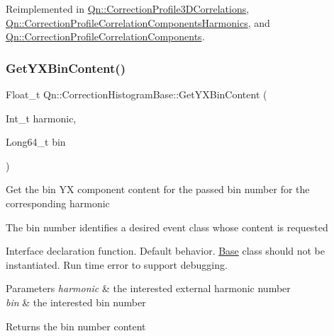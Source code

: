 Reimplemented in \mbox{\hyperlink{classQn_1_1CorrectionProfile3DCorrelations_a779657f7aabd240f26fae0690a5b24a7}{Qn\+::\+Correction\+Profile3\+D\+Correlations}}, \mbox{\hyperlink{classQn_1_1CorrectionProfileCorrelationComponentsHarmonics_a5cad74c0b9396b104ab630c246bf19df}{Qn\+::\+Correction\+Profile\+Correlation\+Components\+Harmonics}}, and \mbox{\hyperlink{classQn_1_1CorrectionProfileCorrelationComponents_a5bf66dc908aa51c9b7661a69023dd946}{Qn\+::\+Correction\+Profile\+Correlation\+Components}}.

\mbox{\label{classQn_1_1CorrectionHistogramBase_a15d59d5e8f2aaa3e42a133fd4b0f8025}} 
\subsubsection{\texorpdfstring{Get\+Y\+X\+Bin\+Content()}{GetYXBinContent()}\hspace{0.1cm}{\footnotesize\ttfamily [2/2]}}
{\footnotesize\ttfamily Float\+\_\+t Qn\+::\+Correction\+Histogram\+Base\+::\+Get\+Y\+X\+Bin\+Content (\begin{DoxyParamCaption}\item[{Int\+\_\+t}]{harmonic,  }\item[{Long64\+\_\+t}]{bin }\end{DoxyParamCaption})\hspace{0.3cm}{\ttfamily [virtual]}}

Get the bin YX component content for the passed bin number for the corresponding harmonic

The bin number identifies a desired event class whose content is requested

Interface declaration function. Default behavior. \mbox{\hyperlink{classBase}{Base}} class should not be instantiated. Run time error to support debugging.


\begin{DoxyParams}{Parameters}
{\em harmonic} & the interested external harmonic number \\
\hline
{\em bin} & the interested bin number \\
\hline
\end{DoxyParams}
\begin{DoxyReturn}{Returns}
the bin number content 
\end{DoxyReturn}


